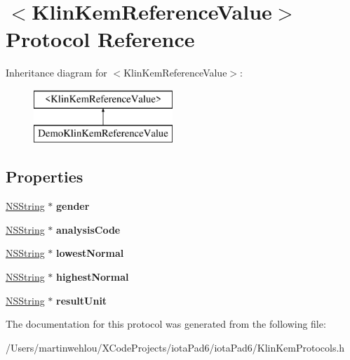 \hypertarget{protocol_klin_kem_reference_value-p}{
\section{$<$KlinKemReferenceValue$>$ Protocol Reference}
\label{protocol_klin_kem_reference_value-p}
}
Inheritance diagram for $<$KlinKemReferenceValue$>$:\begin{figure}[H]
\begin{center}
\leavevmode
\includegraphics[height=2.000000cm]{protocol_klin_kem_reference_value-p}
\end{center}
\end{figure}
\subsection*{Properties}
\begin{DoxyCompactItemize}
\item 
\hypertarget{protocol_klin_kem_reference_value-p_ab37636f74be511bb0ddb011fc62c2027}{
\hyperlink{class_n_s_string}{NSString} $\ast$ {\bfseries gender}}
\label{protocol_klin_kem_reference_value-p_ab37636f74be511bb0ddb011fc62c2027}

\item 
\hypertarget{protocol_klin_kem_reference_value-p_a2417b40cc7a523d0b1e8921250d929d5}{
\hyperlink{class_n_s_string}{NSString} $\ast$ {\bfseries analysisCode}}
\label{protocol_klin_kem_reference_value-p_a2417b40cc7a523d0b1e8921250d929d5}

\item 
\hypertarget{protocol_klin_kem_reference_value-p_ac24c1203012a8bc6418434f64a16d695}{
\hyperlink{class_n_s_string}{NSString} $\ast$ {\bfseries lowestNormal}}
\label{protocol_klin_kem_reference_value-p_ac24c1203012a8bc6418434f64a16d695}

\item 
\hypertarget{protocol_klin_kem_reference_value-p_aaa39881277df22767d1a57a57ac21ea3}{
\hyperlink{class_n_s_string}{NSString} $\ast$ {\bfseries highestNormal}}
\label{protocol_klin_kem_reference_value-p_aaa39881277df22767d1a57a57ac21ea3}

\item 
\hypertarget{protocol_klin_kem_reference_value-p_a245a18541e273efd03ef3e0006047227}{
\hyperlink{class_n_s_string}{NSString} $\ast$ {\bfseries resultUnit}}
\label{protocol_klin_kem_reference_value-p_a245a18541e273efd03ef3e0006047227}

\end{DoxyCompactItemize}


The documentation for this protocol was generated from the following file:\begin{DoxyCompactItemize}
\item 
/Users/martinwehlou/XCodeProjects/iotaPad6/iotaPad6/KlinKemProtocols.h\end{DoxyCompactItemize}
